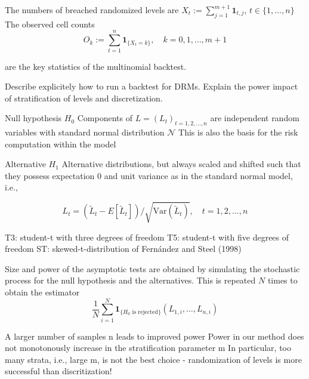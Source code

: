 The numbers of breached randomized levels are \( X_t := \sum_{j=1}^{m+1} \mathbf{1}_{t,j} \), \( t \in \{1, \ldots, n\} \)
The observed cell counts
\[
O_k := \sum_{t=1}^n \mathbf{1}_{\{X_t = k\}}, \quad k = 0, 1, \ldots, m+1
\]

are the key statistics of the multinomial backtest.

Describe explicitely how to run a backtest for DRMs. Explain the power impact of
stratification of levels and discretization.

Null hypothesis \( H_0 \)
Components of \( L = (L_t)_{t=1,2,\ldots,n} \) are independent random variables with standard normal distribution \( \mathcal{N} \)
This is also the basis for the risk computation within the model

Alternative \( H_1 \)
Alternative distributions, but always scaled and shifted such that they possess expectation 0 and unit variance as in the standard normal model, i.e.,

    \[
    L_t = (\tilde{L}_t - E[\tilde{L}_t]) / \sqrt{\text{Var}(\tilde{L}_t)}, \quad t = 1, 2, \ldots, n
    \]

T3: student-t with three degrees of freedom
T5: student-t with five degrees of freedom
ST: skewed-t-distribution of Fernández and Steel (1998)

Size and power of the asymptotic tests are obtained by simulating the stochastic process for the null hypothesis and the alternatives. 
This is repeated \( N \) times to obtain the estimator
\[
\frac{1}{N} \sum_{i=1}^{N} \mathbf{1}_{\{H_0 \text{ is rejected}\}} (L_{1,i}, \ldots, L_{n,i})
\]

A larger number of samples n leads to improved power
Power in our method does not monotonously increase in the stratification parameter m
In particular, too many strata, i.e., large m, is not the best choice - randomization of levels is more
successful than discritization!
